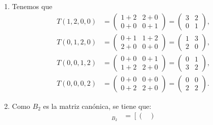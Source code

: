 \documentclass[11pt,respuestas,a4]{aleph-examen}
\begin{document}
\begin{preguntas}
\begin{respuesta}\hspace{0pt}
    \begin{enumerate}
    \item 
        Tenemos que
        \begin{align*}
            T(1,2,0,0) & = \begin{pmatrix}
                1+2 & 2+0 \\
                0+0 & 0+1
            \end{pmatrix} = \begin{pmatrix}
                3 & 2 \\
                0 & 1
            \end{pmatrix},\\[2mm]
            T(0,1,2,0) & = \begin{pmatrix}
                0+1 & 1+2 \\
                2+0 & 0+0
            \end{pmatrix} = \begin{pmatrix}
                1 & 3 \\
                2 & 0
            \end{pmatrix},\\[2mm]
            T(0,0,1,2) & = \begin{pmatrix}
                0+0 & 0+1 \\
                1+2 & 2+0
            \end{pmatrix} = \begin{pmatrix}
                0 & 1 \\
                3 & 2
            \end{pmatrix},\\[2mm]
            T(0,0,0,2) & = \begin{pmatrix}
                0+0 & 0+0 \\
                0+2 & 2+0
            \end{pmatrix} = \begin{pmatrix}
                0 & 0 \\
                2 & 2
            \end{pmatrix}.
        \end{align*}
    \item 
         Como $B_2$ es la matriz canónica, se tiene que:
        \begin{align*}
            [T(1,2,0,0)]_{B_2} &=
            \left[\begin{pmatrix}

\end{pmatrix}
\end{align*}
\end{enumerate}
\end{respuesta}
\end{preguntas}
\end{document}
